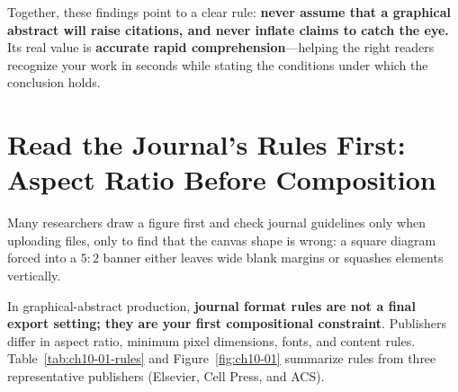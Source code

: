 Together, these findings point to a clear rule: \textbf{never assume that a graphical abstract will raise citations, and never inflate claims to catch the eye.} Its real value is \textbf{accurate rapid comprehension}---helping the right readers recognize your work in seconds while stating the conditions under which the conclusion holds.

\section{Read the Journal's Rules First: Aspect Ratio Before Composition}

Many researchers draw a figure first and check journal guidelines only when uploading files, only to find that the canvas shape is wrong: a square diagram forced into a $5:2$ banner either leaves wide blank margins or squashes elements vertically.

In graphical-abstract production, \textbf{journal format rules are not a final export setting; they are your first compositional constraint}. Publishers differ in aspect ratio, minimum pixel dimensions, fonts, and content rules. Table~\ref{tab:ch10-01-rules} and Figure~\ref{fig:ch10-01} summarize rules from three representative publishers (Elsevier, Cell Press, and ACS).

